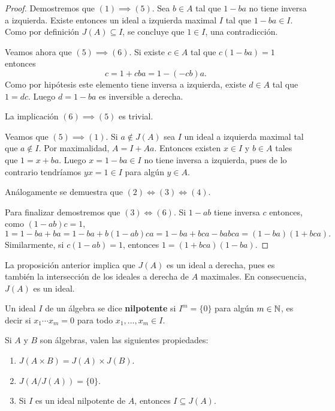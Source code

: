 \begin{proof}
	Demostremos que $(1)\implies(5)$. Sea $b\in A$ tal que $1-ba$ no tiene
	inversa a izquierda. Existe entonces un ideal a izquierda maximal $I$ tal
	que $1-ba\in I$. Como por definición $J(A)\subseteq I$, se
	concluye que $1\in I$, una contradicción.

	Veamos ahora que $(5)\implies (6)$. Si existe $c\in A$ tal que
	$c(1-ba)=1$ entonces 
	\[
	c=1+cba=1-(-cb)a.
	\]
	Como por hipótesis este elemento tiene
	inversa a izquierda, existe $d\in A$ tal que
	$1=dc$. Luego $d=1-ba$ es inversible a derecha. 
	
	La implicación $(6)\implies (5)$ es trivial. 
	
	Veamos que
	$(5)\implies(1)$. Si $a\not\in J(A)$ sea $I$ un ideal a izquierda maximal
	tal que $a\not\in I$. Por maximalidad, $A=I+Aa$. Entonces
	existen $x\in I$ y $b\in A$ tales que $1=x+ba$. Luego
	$x=1-ba\in I$ no tiene inversa a izquierda, pues de lo contrario
	tendríamos $yx=1\in I$ para algún $y\in A$. 

	Análogamente se demuestra que $(2)\Longleftrightarrow (3)\Longleftrightarrow (4)$.

	Para finalizar demostremos que $(3)\Longleftrightarrow (6)$. 
	Si $1-ab$ tiene inversa $c$ entonces, como $(1-ab)c=1$, 
	\[
	1=1-ba+ba=1-ba+b(1-ab)ca=1-ba+bca-babca=(1-ba)(1+bca).
	\]
	Similarmente, si $c(1-ab)=1$, entonces $1=(1+bca)(1-ba)$. 
\end{proof}

La proposición anterior implica que $J(A)$ es un ideal a derecha, pues es también 
la intersección de los ideales a derecha de $A$ maximales. En consecuencia,  
$J(A)$ es un ideal. 

\begin{definition}
Un ideal $I$ de un álgebra se dice \textbf{nilpotente} si $I^m=\{0\}$ para algún $m\in\mathbb{N}$, es decir
si $x_1\cdots x_m=0$ para todo $x_1,\dots,x_m\in I$.
\end{definition}

\begin{proposition} 
	Si $A$ y $B$ son álgebras, valen las siguientes propiedades: 
	\begin{enumerate}
	\item $J(A\times B)=J(A)\times J(B)$.
	\item $J(A/J(A))=\{0\}$.
	\item Si $I$ es un ideal nilpotente de $A$, entonces $I\subseteq J(A)$.
	\end{enumerate}
\end{proposition}

